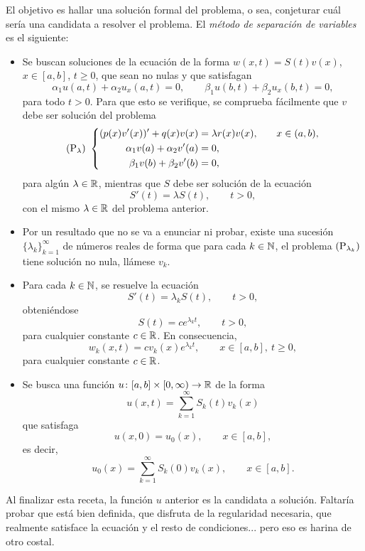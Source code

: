 \documentclass[a4paper, 12pt, extrafontsizes]{memoir}
\begin{document}
El objetivo es hallar una solución formal del problema, o sea, conjeturar cuál sería una candidata a resolver el problema. El \emph{método de separación de variables} es el siguiente:
\begin{itemize}
    \item Se buscan soluciones de la ecuación de la forma $w(x,t) = S(t)v(x)$, $x \in [a,b]$, $t \geq 0$, que sean no nulas y que satisfagan 
    \[\alpha_1u(a,t)+\alpha_2u_x(a,t) = 0, \qquad \beta_1u(b,t)+\beta_2u_x(b,t) = 0,\]
    para todo $t > 0$. Para que esto se verifique, se comprueba fácilmente que $v$ debe ser solución del problema
    \[
        (\textup{P}_\lambda) \ \left\{\begin{alignedat}{5}
            (p(x)v'(x))'+q(x)v(x) &= \lambda r(x)v(x), \qquad & x &\in (a,b), \\
            \alpha_1v(a)+\alpha_2v'(a) &= 0, \\
            \beta_1v(b)+\beta_2v'(b) &= 0,
        \end{alignedat}\right.
    \]
    para algún $\lambda \in \mathbb R$, mientras que $S$ debe ser solución de la ecuación
    \[S'(t) = \lambda S(t), \qquad t >0,\]
    con el mismo $\lambda \in \mathbb R$ del problema anterior.
    \item Por un resultado que no se va a enunciar ni probar, existe una sucesión $\{\lambda_k\}_{k=1}^\infty$ de números reales de forma que para cada $k \in \mathbb N$, el problema $(\textup{P}_{\lambda_k})$ tiene solución no nula, llámese $v_k$.
    \item Para cada $k \in \mathbb N$, se resuelve la ecuación
    \[S'(t) = \lambda_k S(t), \qquad t > 0,\]
    obteniéndose
    \[S(t) = ce^{\lambda_kt}, \qquad t > 0,\]
    para cualquier constante $c \in \mathbb R$. En consecuencia, 
    \[w_k(x,t) = cv_k(x)e^{\lambda_kt}, \qquad x \in [a,b], \ t \geq 0,\] para cualquier constante $c \in \mathbb R$.
    \item Se busca una función $u \colon [a,b] \times [0,\infty) \to \mathbb R$ de la forma
    \[u(x,t) = \sum_{k=1}^\infty S_k(t)v_k(x)\]
    que satisfaga
    \[u(x,0) = u_0(x), \qquad x \in [a,b],\]
    es decir,
    \[u_0(x) = \sum_{k=1}^\infty S_k(0)v_k(x), \qquad x\in [a,b].\]
\end{itemize}

Al finalizar esta receta, la función $u$ anterior es la candidata a solución. Faltaría probar que está bien definida, que disfruta de la regularidad necesaria, que realmente satisface la ecuación y el resto de condiciones... pero eso es harina de otro costal.
\end{document}
